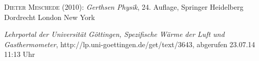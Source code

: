 \documentclass[12pt,a4paper,titlepage,headinclude,bibtotoc]{scrartcl}
\begin{document}

\begin{thebibliography}{100}

	\textsc{Dieter Meschede} (2010): \emph{Gerthsen Physik}, 24. Auflage, Springer Heidelberg
Dordrecht London New York

	\emph{Lehrportal der Universität Göttingen, Spezifische Wärme der Luft und Gasthermometer},
  http://lp.uni-goettingen.de/get/text/3643, abgerufen 23.07.14 11:13 Uhr

\end{thebibliography}
\end{document}
